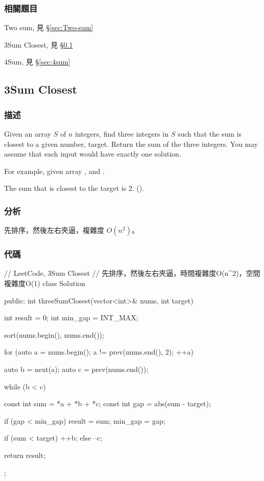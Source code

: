 \subsubsection{相關題目}
\begindot
\item Two sum, 見 \S \ref{sec:Two-sum}
\item 3Sum Closest, 見 \S \ref{sec:3sum-closest}
\item 4Sum, 見 \S \ref{sec:4sum}
\myenddot

\subsection{3Sum Closest} %
\label{sec:3sum-closest}


\subsubsection{描述}
Given an array $S$ of $n$ integers, find three integers in $S$ such that the sum is closest to a given number, target. Return the sum of the three integers. You may assume that each input would have exactly one solution.

For example, given array , and .

The sum that is closest to the target is 2. ().


\subsubsection{分析}
先排序，然後左右夾逼，複雜度 $O(n^2)$。


\subsubsection{代碼}
\begin{Code}
// LeetCode, 3Sum Closest
// 先排序，然後左右夾逼，時間複雜度O(n^2)，空間複雜度O(1)
class Solution {
public:
    int threeSumClosest(vector<int>& nums, int target) {
        int result = 0;
        int min_gap = INT_MAX;

        sort(nums.begin(), nums.end());

        for (auto a = nums.begin(); a != prev(nums.end(), 2); ++a) {
            auto b = next(a);
            auto c = prev(nums.end());

            while (b < c) {
                const int sum = *a + *b + *c;
                const int gap = abs(sum - target);

                if (gap < min_gap) {
                    result = sum;
                    min_gap = gap;
                }

                if (sum < target) ++b;
                else              --c;
            }
        }

        return result;
    }
};
\end{Code}


